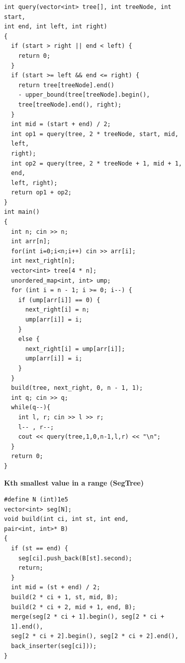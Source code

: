 \begin{lstlisting}
int query(vector<int> tree[], int treeNode, int
start,
int end, int left, int right)
{
  if (start > right || end < left) {
    return 0;
  }
  if (start >= left && end <= right) {
    return tree[treeNode].end()
    - upper_bound(tree[treeNode].begin(),
    tree[treeNode].end(), right);
  }
  int mid = (start + end) / 2;
  int op1 = query(tree, 2 * treeNode, start, mid,
  left,
  right);
  int op2 = query(tree, 2 * treeNode + 1, mid + 1,
  end,
  left, right);
  return op1 + op2;
}
int main()
{
  int n; cin >> n;
  int arr[n];
  for(int i=0;i<n;i++) cin >> arr[i];
  int next_right[n];
  vector<int> tree[4 * n];
  unordered_map<int, int> ump;
  for (int i = n - 1; i >= 0; i--) {
    if (ump[arr[i]] == 0) {
      next_right[i] = n;
      ump[arr[i]] = i;
    }
    else {
      next_right[i] = ump[arr[i]];
      ump[arr[i]] = i;
    }
  }
  build(tree, next_right, 0, n - 1, 1);
  int q; cin >> q;
  while(q--){
    int l, r; cin >> l >> r;
    l-- , r--;
    cout << query(tree,1,0,n-1,l,r) << "\n";
  }
  return 0;
}
\end{lstlisting}

\textbf{Kth smallest value in a range (SegTree)}
\begin{lstlisting}
#define N (int)1e5
vector<int> seg[N];
void build(int ci, int st, int end,
pair<int, int>* B)
{
  if (st == end) {
    seg[ci].push_back(B[st].second);
    return;
  }
  int mid = (st + end) / 2;
  build(2 * ci + 1, st, mid, B);
  build(2 * ci + 2, mid + 1, end, B);
  merge(seg[2 * ci + 1].begin(), seg[2 * ci +
  1].end(),
  seg[2 * ci + 2].begin(), seg[2 * ci + 2].end(),
  back_inserter(seg[ci]));
}
\end{lstlisting}
